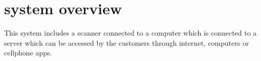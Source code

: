 \section{system overview}

This system includes a scanner connected to a computer which is connected to a server which can be accessed by the customers through internet, computers or cellphone apps.
